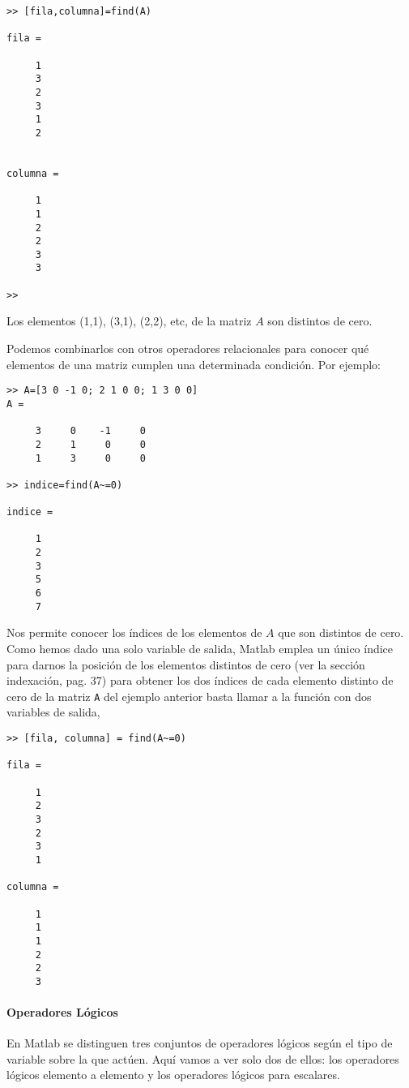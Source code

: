 \begin{verbatim}
>> [fila,columna]=find(A)

fila =

     1
     3
     2
     3
     1
     2


columna =

     1
     1
     2
     2
     3
     3

>> 
\end{verbatim}

Los elementos (1,1), (3,1), (2,2), etc, de la matriz $A$ son distintos de cero.

Podemos combinarlos con otros operadores relacionales para conocer qué elementos de una matriz cumplen una determinada condición. Por ejemplo:

\begin{verbatim}
>> A=[3 0 -1 0; 2 1 0 0; 1 3 0 0]
A =

     3     0    -1     0
     2     1     0     0
     1     3     0     0
     
>> indice=find(A~=0)

indice =

     1
     2
     3
     5
     6
     7
\end{verbatim}

Nos permite conocer los índices de los elementos de $A$ que son distintos de cero. Como hemos dado una solo variable de salida, Matlab emplea un único índice para darnos la posición de los elementos distintos de cero (ver la sección indexación, pag. 37) para obtener los dos índices de cada elemento distinto de cero de la matriz \texttt{A} del ejemplo anterior basta llamar a la función con dos variables de salida,

\begin{verbatim}
>> [fila, columna] = find(A~=0)

fila =

     1
     2
     3
     2
     3
     1

columna =

     1
     1
     1
     2
     2
     3
\end{verbatim} 

\paragraph{Operadores Lógicos}
En Matlab se distinguen tres conjuntos de operadores lógicos según el tipo de variable sobre la que actúen. Aquí vamos a ver solo dos de ellos: los operadores lógicos elemento a elemento y los operadores lógicos para escalares.

